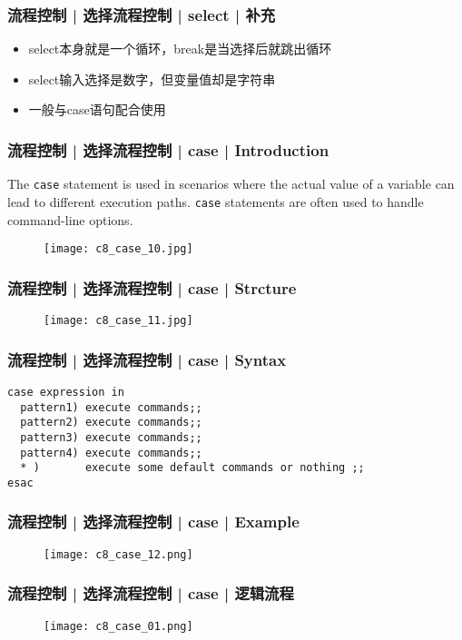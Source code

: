 \begin{frame}
  \frametitle{流程控制 | 选择流程控制 | select | 补充}
  \begin{itemize}
    \item select本身就是一个循环，break是当选择后就跳出循环
    \item select输入选择是数字，但变量值却是字符串
    \item 一般与case语句配合使用
  \end{itemize}
\end{frame}

\begin{frame}[fragile]
  \frametitle{流程控制 | 选择流程控制 | case | Introduction}
  The \verb|case| statement is used in scenarios where the actual value of a variable can lead to different execution paths. \verb|case| statements are often used to handle command-line options.
  \begin{figure}
    \centering
    \texttt{[image: c8\_case\_10.jpg]}
  \end{figure}
\end{frame}

\begin{frame}
  \frametitle{流程控制 | 选择流程控制 | case | Strcture}
  \begin{figure}
    \centering
    \texttt{[image: c8\_case\_11.jpg]}
  \end{figure}
\end{frame}

\begin{frame}[fragile]
  \frametitle{流程控制 | 选择流程控制 | case | Syntax}
\begin{lstlisting}
case expression in
  pattern1) execute commands;;
  pattern2) execute commands;;
  pattern3) execute commands;;
  pattern4) execute commands;;
  * )       execute some default commands or nothing ;;
esac
\end{lstlisting}
\end{frame}

\begin{frame}
  \frametitle{流程控制 | 选择流程控制 | case | Example}
  \begin{figure}
    \centering
    \texttt{[image: c8\_case\_12.png]}
  \end{figure}
\end{frame}

\begin{frame}
  \frametitle{流程控制 | 选择流程控制 | case | 逻辑流程}
  \begin{figure}
    \centering
    \texttt{[image: c8\_case\_01.png]}
  \end{figure}
\end{frame}

